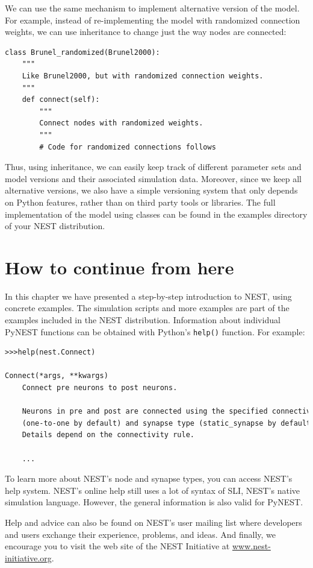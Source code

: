\documentclass{article}
\begin{document}
We can use the same mechanism to implement alternative version of the
model. For example, instead of re-implementing the model with
randomized connection weights, we can use inheritance to change just the way
nodes are connected:
\begin{lstlisting}[name=brunel-classes]
class Brunel_randomized(Brunel2000):
    """
    Like Brunel2000, but with randomized connection weights.
    """
    def connect(self):
        """
        Connect nodes with randomized weights.
        """
        # Code for randomized connections follows
\end{lstlisting}
Thus, using inheritance, we can easily keep track of different
parameter sets and model versions and their associated simulation
data. Moreover, since we keep all alternative versions, we also have a
simple versioning system that only depends on Python features, rather
than on third party tools or libraries.
The full implementation of the model using classes can be found in the
examples directory of your NEST distribution.

\section{How to continue from here}
In this chapter we have presented a step-by-step introduction to NEST,
using concrete examples. The simulation scripts and more examples are
part of the examples included in the NEST distribution. 
Information about individual PyNEST functions can be obtained with
Python's \lstinline!help()! function. For example:
\begin{lstlisting}[numbers=none,basicstyle=\footnotesize, language=tex]
>>>help(nest.Connect)

Connect(*args, **kwargs)
    Connect pre neurons to post neurons.
    
    Neurons in pre and post are connected using the specified connectivity
    (one-to-one by default) and synapse type (static_synapse by default).
    Details depend on the connectivity rule.
  
    ...  
 \end{lstlisting}

To learn more about NEST's node and synapse types, you can access
NEST's help system. NEST's online help still
uses a lot of syntax of SLI, NEST's native simulation language. However,
the general information is also valid for PyNEST.

Help and advice can also be found on NEST's user mailing list where
developers and users exchange their experience, problems, and ideas.
And finally, we encourage you to visit the web site of the NEST
Initiative at \url{www.nest-initiative.org}.
\end{document}

